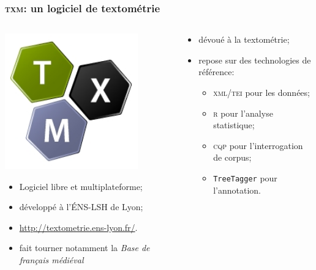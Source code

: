 \documentclass{beamer}
\begin{document}
\begin{frame}[fragile]
\frametitle{\textsc{txm}: un logiciel de textométrie}


\begin{columns}
	\begin{column}{0.30\textwidth}
	\begin{center}
	\includegraphics[width= 0.8\textwidth]{img/txm.png}
	\end{center}
\begin{itemize}
	\item Logiciel libre et multiplateforme;
	\item développé à l'ÉNS-LSH de Lyon;
	\item \url{http://textometrie.ens-lyon.fr/}.
	\item fait tourner notamment la \textit{Base de français médiéval}
\end{itemize}
	\end{column}
	\begin{column}{0.66\textwidth}
		\begin{itemize}
			\item dévoué à la textométrie;
			\item repose sur des technologies de référence:
				\begin{itemize}
					\item \textsc{xml/tei} pour les données;
					\item \textsc{r} pour l'analyse statistique;
					\item \textsc{cqp} pour l'interrogation de corpus;
					\item \texttt{TreeTagger} pour l'annotation.
				\end{itemize}
		\end{itemize}
	\end{column}
\end{columns}
\end{frame}
\end{document}
